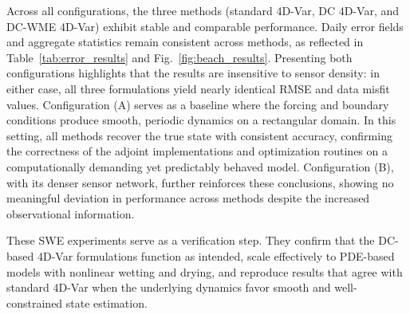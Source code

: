 \documentclass[final,1p,times]{elsarticle}
\begin{document}
Across all configurations, the three methods (standard 4D-Var, DC 4D-Var, and DC-WME 4D-Var) exhibit stable and comparable performance. Daily error fields and aggregate statistics remain consistent across methods, as reflected in Table~\ref{tab:error_results} and Fig.~\ref{fig:beach_results}. Presenting both configurations highlights that the results are insensitive to sensor density: in either case, all three formulations yield nearly identical RMSE and data misfit values. Configuration (A) serves as a baseline where the forcing and boundary conditions produce smooth, periodic dynamics on a rectangular domain. In this setting, all methods recover the true state with consistent accuracy, confirming the correctness of the adjoint implementations and optimization routines on a computationally demanding yet predictably behaved model. Configuration (B), with its denser sensor network, further reinforces these conclusions, showing no meaningful deviation in performance across methods despite the increased observational information.

These SWE experiments serve as a verification step. They confirm that the DC-based 4D-Var formulations function as intended, scale effectively to PDE-based models with nonlinear wetting and drying, and reproduce results that agree with standard 4D-Var when the underlying dynamics favor smooth and well-constrained state estimation.

 
\end{document}
